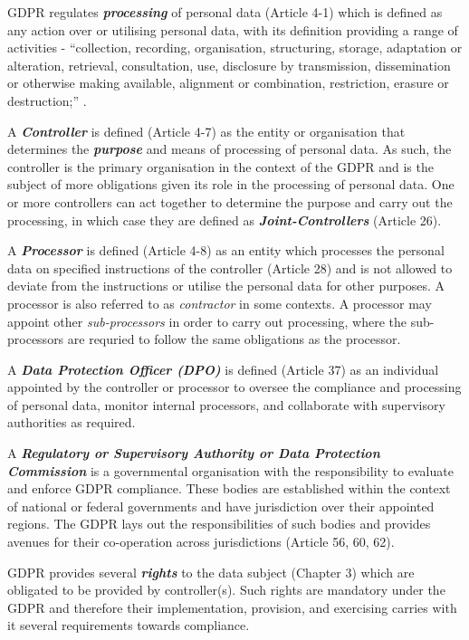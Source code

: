 GDPR regulates \textit{\textbf{processing}} of personal data (Article 4-1) which is defined as any action over or utilising personal data, with its definition providing a range of activities - ``collection, recording, organisation, structuring, storage, adaptation or alteration, retrieval, consultation, use, disclosure by transmission, dissemination or otherwise making available, alignment or combination, restriction, erasure or destruction;'' \cite{noauthor_regulation_2016}.

A \textit{\textbf{Controller}} is defined (Article 4-7) as the entity or organisation that determines the \textit{\textbf{purpose}} and means of processing of personal data. As such, the controller is the primary organisation in the context of the GDPR and is the subject of more obligations given its role in the processing of personal data. One or more controllers can act together to determine the purpose and carry out the processing, in which case they are defined as \textit{\textbf{Joint-Controllers}} (Article 26).

A \textit{\textbf{Processor}} is defined (Article 4-8) as an entity which processes the personal data on specified instructions of the controller (Article 28) and is not allowed to deviate from the instructions or utilise the personal data for other purposes. A processor is also referred to as \textit{contractor} in some contexts. A processor may appoint other \textit{sub-processors} in order to carry out processing, where the sub-processors are requried to follow the same obligations as the processor.

A \textit{\textbf{Data Protection Officer (DPO)}} is defined (Article 37) as an individual appointed by the controller or processor to oversee the compliance and processing of personal data, monitor internal processors, and collaborate with supervisory authorities as required.

A \textit{\textbf{Regulatory or Supervisory Authority or Data Protection Commission}} is a governmental organisation with the responsibility to evaluate and enforce GDPR compliance. These bodies are established within the context of national or federal governments and have jurisdiction over their appointed regions. The GDPR lays out the responsibilities of such bodies and provides avenues for their co-operation across jurisdictions (Article 56, 60, 62).

GDPR provides several \textbf{\textit{rights}} to the data subject (Chapter 3) which are obligated to be provided by controller(s). Such rights are mandatory under the GDPR and therefore their implementation, provision, and exercising carries with it several requirements towards compliance.

